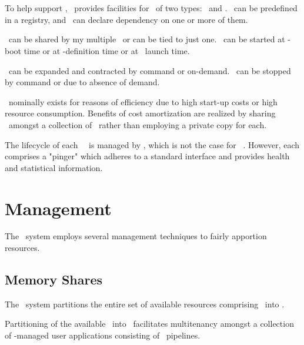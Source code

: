     \section{\varServices}
       
    To help support \varJobs, \varDUCC~provides facilities for \varServices~of two types: 
    \varUIMA~and \varPingOnly. \varServices~can be predefined in a registry, and 
    \varJobs~can declare dependency on one or more of them.
    
    \varServices~can be shared by my multiple \varJobs~or can be tied to just one.
    \varServices~can be started at \varDUCC-boot time or at \varService-definition time or
    at \varJob~launch time.
    
    \varServices~can be expanded and contracted by command or on-demand.  
    \varServices~can be stopped by command or due to absence of demand.
    
    \varServices~nominally exists for reasons of efficiency due to high start-up costs
    or high resource consumption.  Benefits of cost amortization are realized by sharing
    \varServices~amongst a collection of \varJobs~rather than employing a private copy 
    for each.
    
    The lifecycle of each \varUIMA~\varService~is managed by \varDUCC, which is not the
    case for \varPingOnly~\varServices.  However, each comprises a "pinger" which 
    adheres to a standard interface and provides health and statistical information.
    
    \section{Management} 
    
    The \varDUCC~system employs several management techniques to fairly apportion
    resources.
    
    \subsection{Memory Shares} 
    
    The \varDUCC~system partitions the entire set of available resources comprising
    \varNodesMachinesComputers~into \varShares.
    
    Partitioning of the available \varNodesMachinesComputers~into \varShares~facilitates
    multitenancy amongst a collection of \varDUCC-managed user applications consisting 
    of \varUIMA~pipelines.
    
